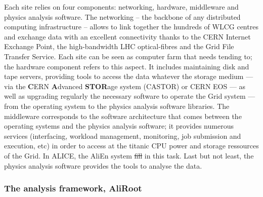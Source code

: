 \documentclass[ALICE,manyauthors]{cernphprep}
\providecommand{\DIFaddtex}[1]{{\protect\color{blue}\uwave{#1}}} %
\providecommand{\DIFdeltex}[1]{{\protect\color{red}\sout{#1}}}                      %
\providecommand{\DIFaddbegin}{} %
\providecommand{\DIFaddend}{} %
\providecommand{\DIFdelbegin}{} %
\providecommand{\DIFdelend}{} %
\providecommand{\DIFadd}[1]{\texorpdfstring{\DIFaddtex{#1}}{#1}} %
\providecommand{\DIFdel}[1]{\texorpdfstring{\DIFdeltex{#1}}{}} %
\newcommand{\DIFscaledelfig}{0.5}
\newlength{\DIFdelgraphicswidth} %
\newlength{\DIFdelgraphicsheight} %
\newcommand{\DIFaddincludegraphics}[2][]{{\color{blue}\fbox{\DIFOincludegraphics[#1]{#2}}}} %
\newcommand{\DIFdelincludegraphics}[2][]{%
\sbox{\DIFdelgraphicsbox}{\DIFOincludegraphics[#1]{#2}}%
\settoboxwidth{\DIFdelgraphicswidth}{\DIFdelgraphicsbox} %
\settoboxtotalheight{\DIFdelgraphicsheight}{\DIFdelgraphicsbox} %
\scalebox{\DIFscaledelfig}{%
\parbox[b]{\DIFdelgraphicswidth}{\usebox{\DIFdelgraphicsbox}\\[-\baselineskip] \rule{\DIFdelgraphicswidth}{0em}}\llap{\resizebox{\DIFdelgraphicswidth}{\DIFdelgraphicsheight}{%
\setlength{\unitlength}{\DIFdelgraphicswidth}%
\begin{picture}(1,1)%
\thicklines\linethickness{2pt} %
{\color[rgb]{1,0,0}\put(0,0){\framebox(1,1){}}}%
{\color[rgb]{1,0,0}\put(0,0){\line( 1,1){1}}}%
{\color[rgb]{1,0,0}\put(0,1){\line(1,-1){1}}}%
\end{picture}%
}\hspace*{3pt}}} %
} %
\DeclareRobustCommand{\DIFaddbegin}{\DIFOaddbegin \let\includegraphics\DIFaddincludegraphics} %
\DeclareRobustCommand{\DIFaddend}{\DIFOaddend \let\includegraphics\DIFOincludegraphics} %
\DeclareRobustCommand{\DIFdelbegin}{\DIFOdelbegin \let\includegraphics\DIFdelincludegraphics} %
\DeclareRobustCommand{\DIFdelend}{\DIFOaddend \let\includegraphics\DIFOincludegraphics} %
\begin{document}
Each site relies on four components: networking, hardware, middleware and physics analysis software. The networking -- the backbone of any distributed computing infrastructure -- allows to link together the hundreds of WLCG centres and exchange data with an excellent connectivity thanks to the CERN Internet Exchange Point, the high-bandwidth LHC optical-fibres and the Grid File Transfer Service. Each site can be seen as \DIFaddbegin \DIFadd{a }\DIFaddend computer farm that needs tending to; the hardware component refers to this aspect. It includes maintaining disk and tape servers, providing tools to access the data whatever the storage medium --- via the \textbf{C}ERN \textbf{A}dvanced \textbf{STOR}age system (CASTOR) or CERN EOS --- as well as upgrading regularly the necessary software to operate the Grid system --- from the operating system to the physics analysis software libraries. The middleware corresponds to the software architecture that comes between the operating systems and the physics analysis software; it provides numerous services (interfacing, workload management, monitoring, job submission and execution, etc) in order to access at the titanic CPU power and storage ressources of the Grid. In ALICE, the AliEn system \DIFdelbegin \DIFdel{fill }\DIFdelend \DIFaddbegin \DIFadd{fills }\DIFaddend in this task. Last but not least, the physics analysis software provides the tools to analyse the data.


\subsubsection{The analysis framework, AliRoot}
\label{subsubsec:AliRoot}
\end{document}
